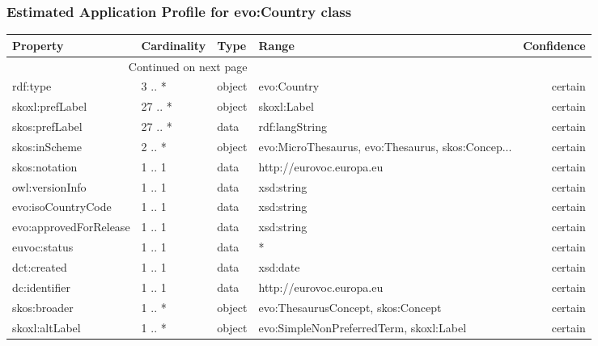 \documentclass[10pt,a4paper,titlepage,final]{article}
\begin{document}
\subsubsection{Estimated Application Profile for evo:Country class}
\begin{tabularx}{\textwidth}{lllXr}
\toprule
               Property & Cardinality &    Type &                                              Range & Confidence \\
\midrule
\endhead
\midrule
\multicolumn{3}{r}{{Continued on next page}} \\
\midrule
\endfoot

\bottomrule
\endlastfoot
               rdf:type &      3 .. * &  object &                                        evo:Country &    certain \\
        skoxl:prefLabel &     27 .. * &  object &                                        skoxl:Label &    certain \\
         skos:prefLabel &     27 .. * &    data &                                     rdf:langString &    certain \\
          skos:inScheme &      2 .. * &  object &  evo:MicroThesaurus, evo:Thesaurus, skos:Concep... &    certain \\
          skos:notation &      1 .. 1 &    data &                           http://eurovoc.europa.eu &    certain \\
        owl:versionInfo &      1 .. 1 &    data &                                         xsd:string &    certain \\
     evo:isoCountryCode &      1 .. 1 &    data &                                         xsd:string &    certain \\
 evo:approvedForRelease &      1 .. 1 &    data &                                         xsd:string &    certain \\
           euvoc:status &      1 .. 1 &    data &                                                  * &    certain \\
            dct:created &      1 .. 1 &    data &                                           xsd:date &    certain \\
          dc:identifier &      1 .. 1 &    data &                           http://eurovoc.europa.eu &    certain \\
           skos:broader &      1 .. * &  object &                 evo:ThesaurusConcept, skos:Concept &    certain \\
         skoxl:altLabel &      1 .. * &  object &            evo:SimpleNonPreferredTerm, skoxl:Label &    certain \\

\end{tabularx}
\end{document}
